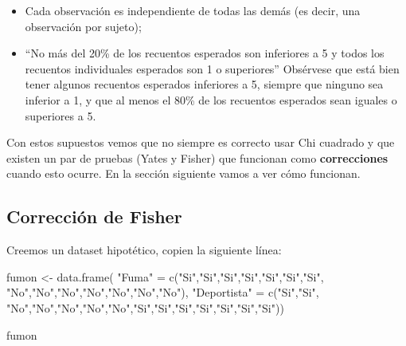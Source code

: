 \documentclass[
]{book}
\newenvironment{Shaded}{\begin{snugshade}}{\end{snugshade}}
\newcommand{\FunctionTok}[1]{\textcolor[rgb]{0.00,0.00,0.00}{#1}}
\newcommand{\NormalTok}[1]{#1}
\newcommand{\OtherTok}[1]{\textcolor[rgb]{0.56,0.35,0.01}{#1}}
\newcommand{\StringTok}[1]{\textcolor[rgb]{0.31,0.60,0.02}{#1}}
\begin{document}
\begin{itemize}
\item
  Cada observación es independiente de todas las demás (es decir, una observación por sujeto);
\item
  ``No más del 20\% de los recuentos esperados son inferiores a 5 y todos los recuentos individuales esperados son 1 o superiores'' Obsérvese que está bien tener algunos recuentos esperados inferiores a 5, siempre que ninguno sea inferior a 1, y que al menos el 80\% de los recuentos esperados sean iguales o superiores a 5.
\end{itemize}

Con estos supuestos vemos que no siempre es correcto usar Chi cuadrado y que existen un par de pruebas (Yates y Fisher) que funcionan como \textbf{correcciones} cuando esto ocurre. En la sección siguiente vamos a ver cómo funcionan.

\hypertarget{correcciuxf3n-de-fisher}{%
\subsection{Corrección de Fisher}\label{correcciuxf3n-de-fisher}}

Creemos un dataset hipotético, copien la siguiente línea:

\begin{Shaded}
\begin{Highlighting}[]
\NormalTok{fumon }\OtherTok{\textless{}{-}} \FunctionTok{data.frame}\NormalTok{(}
  \StringTok{"Fuma"} \OtherTok{=} \FunctionTok{c}\NormalTok{(}\StringTok{"Si"}\NormalTok{,}\StringTok{"Si"}\NormalTok{,}\StringTok{"Si"}\NormalTok{,}\StringTok{"Si"}\NormalTok{,}\StringTok{"Si"}\NormalTok{,}\StringTok{"Si"}\NormalTok{,}\StringTok{"Si"}\NormalTok{, }\StringTok{"No"}\NormalTok{,}\StringTok{"No"}\NormalTok{,}\StringTok{"No"}\NormalTok{,}\StringTok{"No"}\NormalTok{,}\StringTok{"No"}\NormalTok{,}\StringTok{"No"}\NormalTok{,}\StringTok{"No"}\NormalTok{),}
  \StringTok{"Deportista"} \OtherTok{=} \FunctionTok{c}\NormalTok{(}\StringTok{"Si"}\NormalTok{,}\StringTok{"Si"}\NormalTok{, }\StringTok{"No"}\NormalTok{,}\StringTok{"No"}\NormalTok{,}\StringTok{"No"}\NormalTok{,}\StringTok{"No"}\NormalTok{,}\StringTok{"No"}\NormalTok{,}\StringTok{"Si"}\NormalTok{,}\StringTok{"Si"}\NormalTok{,}\StringTok{"Si"}\NormalTok{,}\StringTok{"Si"}\NormalTok{,}\StringTok{"Si"}\NormalTok{,}\StringTok{"Si"}\NormalTok{,}\StringTok{"Si"}\NormalTok{))}

\NormalTok{fumon}
\end{Highlighting}
\end{Shaded}
\end{document}
